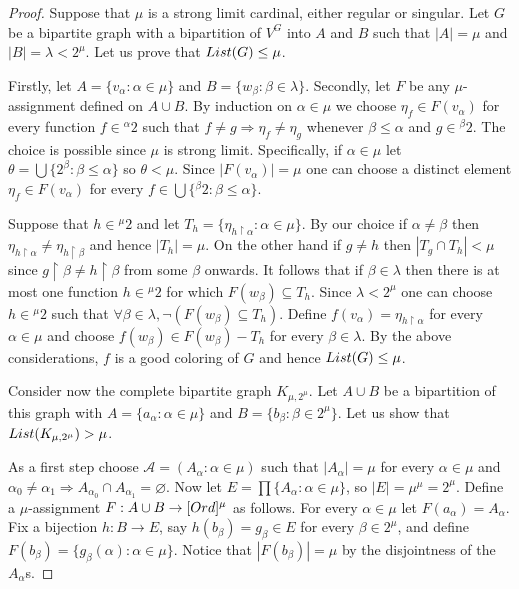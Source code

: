 \documentclass[10pt,a4paper]{amsart}
\begin{document}
\begin{proof}
Suppose that $\mu$ is a strong limit cardinal, either regular or singular.
Let $G$ be a bipartite graph with a bipartition of $V^G$ into $A$ and $B$ such that $|A|=\mu$ and $|B|=\lambda<2^\mu$.
Let us prove that ${\rm List}(G)\leq\mu$.

Firstly, let $A=\{v_\alpha:\alpha\in\mu\}$ and $B=\{w_\beta:\beta\in\lambda\}$.
Secondly, let $F$ be any $\mu$-assignment defined on $A\cup B$.
By induction on $\alpha\in\mu$ we choose $\eta_f\in F(v_\alpha)$ for every function $f\in{}^\alpha 2$ such that $f\neq g\Rightarrow\eta_f\neq\eta_g$ whenever $\beta\leq\alpha$ and $g\in{}^\beta 2$.
The choice is possible since $\mu$ is strong limit.
Specifically, if $\alpha\in\mu$ let $\theta=\bigcup\{2^\beta:\beta\leq\alpha\}$ so $\theta<\mu$.
Since $|F(v_\alpha)|=\mu$ one can choose a distinct element $\eta_f\in F(v_\alpha)$ for every $f\in\bigcup\{{}^\beta 2:\beta\leq\alpha\}$.

Suppose that $h\in{}^\mu 2$ and let $T_h=\{\eta_{h\upharpoonright\alpha}:\alpha\in\mu\}$.
By our choice if $\alpha\neq\beta$ then $\eta_{h\upharpoonright\alpha}\neq\eta_{h\upharpoonright\beta}$ and hence $|T_h|=\mu$.
On the other hand if $g\neq h$ then $|T_g\cap T_h|<\mu$ since $g\upharpoonright\beta\neq h\upharpoonright\beta$ from some $\beta$ onwards.
It follows that if $\beta\in\lambda$ then there is at most one function $h\in{}^\mu 2$ for which $F(w_\beta)\subseteq T_h$.
Since $\lambda<2^\mu$ one can choose $h\in{}^\mu 2$ such that $\forall\beta\in\lambda,\neg(F(w_\beta)\subseteq T_h)$.
Define $f(v_\alpha)=\eta_{h\upharpoonright\alpha}$ for every $\alpha\in\mu$ and choose $f(w_\beta)\in F(w_\beta)-T_h$ for every $\beta\in\lambda$.
By the above considerations, $f$ is a good coloring of $G$ and hence ${\rm List}(G)\leq\mu$.

Consider now the complete bipartite graph $K_{\mu,2^\mu}$.
Let $A\cup B$ be a bipartition of this graph with $A=\{a_\alpha:\alpha\in\mu\}$ and $B=\{b_\beta:\beta\in 2^\mu\}$.
Let us show that ${\rm List}(K_{\mu,2^\mu})>\mu$.

As a first step choose $\mathcal{A}=(A_\alpha:\alpha\in\mu)$ such that $|A_\alpha|=\mu$ for every $\alpha\in\mu$ and $\alpha_0\neq\alpha_1\Rightarrow A_{\alpha_0}\cap A_{\alpha_1}=\varnothing$.
Now let $E=\prod\{A_\alpha:\alpha\in\mu\}$, so $|E|=\mu^\mu=2^\mu$.
Define a $\mu$-assignment $F:A\cup B\rightarrow[{\rm Ord}]^\mu$ as follows.
For every $\alpha\in\mu$ let $F(a_\alpha)=A_\alpha$.
Fix a bijection $h:B\rightarrow E$, say $h(b_\beta)=g_\beta\in E$ for every $\beta\in 2^\mu$, and define $F(b_\beta)=\{g_\beta(\alpha):\alpha\in\mu\}$.
Notice that $|F(b_\beta)|=\mu$ by the disjointness of the $A_\alpha$s.


\end{proof}
\end{document}
